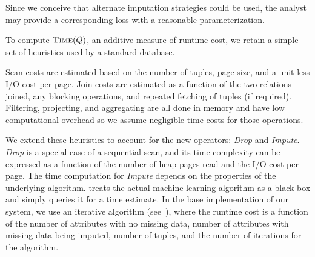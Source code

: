 Since we conceive that
alternate imputation strategies could be used, the analyst may provide a corresponding
loss with a reasonable parameterization.

To compute $\textsc{Time}(Q)$, an additive measure of runtime cost, we retain a simple set of heuristics used by a standard 
database. 


Scan costs are estimated based on the number of tuples, 
page size, and a unit-less I/O cost per page. Join costs are estimated as a function
of the two relations joined, any blocking operations, and repeated fetching of tuples (if required).
Filtering, projecting, and aggregating are all done in memory and have low computational overhead
so we assume negligible time costs for those operations. 

We extend these heuristics to 
account for the new operators: \textit{Drop} and \textit{Impute}. \textit{Drop} is a special case of a sequential scan, and its time
complexity can be expressed as a function of the number of heap pages read and the I/O cost
per page. The time computation for \textit{Impute} depends on the properties of the underlying
algorithm. \ProjectName{} treats the actual machine learning algorithm as a black box
and simply queries it for a time estimate. In the base implementation of our system,
we use an iterative algorithm (see~), where the runtime cost
is a function of the number of attributes with no missing data, number of attributes with
missing data being imputed, number of tuples, and the number of iterations for the algorithm.

